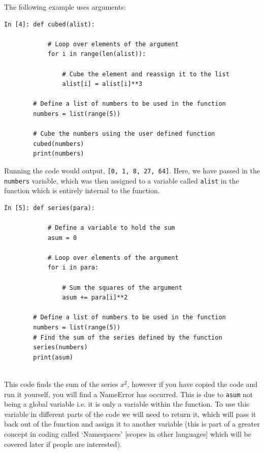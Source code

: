 \noindent The following example uses arguments:
\begin{lstlisting}[style=PY]
In [4]: def cubed(alist):

            # Loop over elements of the argument
            for i in range(len(alist)):
            
                # Cube the element and reassign it to the list
                alist[i] = alist[i]**3
                
        # Define a list of numbers to be used in the function
        numbers = list(range(5))
        
        # Cube the numbers using the user defined function
        cubed(numbers)
        print(numbers)
\end{lstlisting}

\noindent Running the code would output, \texttt{[0, 1, 8, 27, 64]}. Here, we have passed in the \texttt{numbers} variable, which was then assigned to a variable called \texttt{alist} in the function which is entirely internal to the function. 

\begin{lstlisting}[style=PY]
In [5]: def series(para):

            # Define a variable to hold the sum
            asum = 0
            
            # Loop over elements of the argument
            for i in para:
            
                # Sum the squares of the argument
                asum += para[i]**2
                
        # Define a list of numbers to be used in the function
        numbers = list(range(5))
        # Find the sum of the series defined by the function
        series(numbers)
        print(asum)
        
\end{lstlisting}
This code finds the sum of the series $x^{2}$, however if you have copied the code and run it yourself, you will find a NameError has occurred. This is due to \texttt{asum} not being a global variable i.e. it is only a variable within the function. To use this variable in different parts of the code we will need to return it, which will pass it back out of the function and assign it to another variable (this is part of a greater concept in coding called `Namespaces' [scopes in other languages] which will be covered later if people are interested).

\newpage

